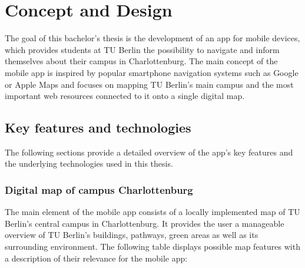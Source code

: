 \chapter{Concept and Design}
\label{cha:conceptanddesign}
The goal of this bachelor's thesis is the development of an app for mobile devices, which provides students at TU Berlin the possibility to navigate and inform themselves about their campus in Charlottenburg. The main concept of the mobile app is inspired by popular smartphone navigation systems such as Google or Apple Maps and focuses on mapping TU Berlin's main campus and the most important web resources connected to it onto a single digital map.

\section{Key features and technologies}
The following sections provide a detailed overview of the app's key features and the underlying technologies used in this thesis.

\subsection{Digital map of campus Charlottenburg}
The main element of the mobile app consists of a locally implemented map of TU Berlin's central campus in Charlottenburg. It provides the user a manageable overview of TU Berlin's buildings, pathways, green areas as well as its surrounding environment. The following table displays possible map features with a description of their relevance for the mobile app:\\

